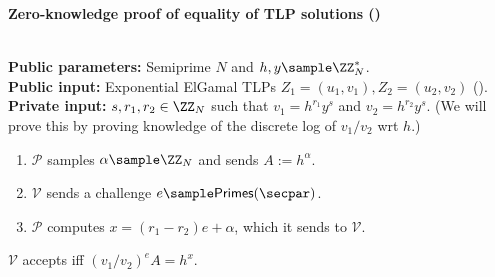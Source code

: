     \begin{mdframed}
    \begin{center}
        \textbf{Zero-knowledge proof of equality of TLP solutions (\zkposeq)}
    \end{center}
    \hfill\\
    \textbf{Public parameters:} Semiprime $N$ and $h, y \sample \ZZ_N^*$. \hfill\\
    \textbf{Public input:} Exponential ElGamal TLPs $Z_1 = (u_1, v_1), Z_2 = (u_2, v_2)$ ().\hfill\\
    \textbf{Private input:} $s, r_1, r_2 \in \ZZ_N$ such that $v_1 = h^{r_1} y^s$ and $v_2 = h^{r_2} y^s$. (We will prove this by proving knowledge of the discrete log of $v_1/v_2$ wrt $h$.)
    \begin{enumerate}
        \item $\mathcal{P}$ samples $\alpha \sample \ZZ_N$ and sends $A := h^\alpha$.
        \item $\mathcal{V}$ sends a challenge $e \sample \mathsf{Primes}(\secpar)$.
        \item $\mathcal{P}$ computes $x = (r_1 - r_2) e + \alpha$,
        which it sends to $\mathcal{V}$.
    \end{enumerate}
    $\mathcal{V}$ accepts iff $(v_1/v_2)^e A = h^x$.
    \end{mdframed}

